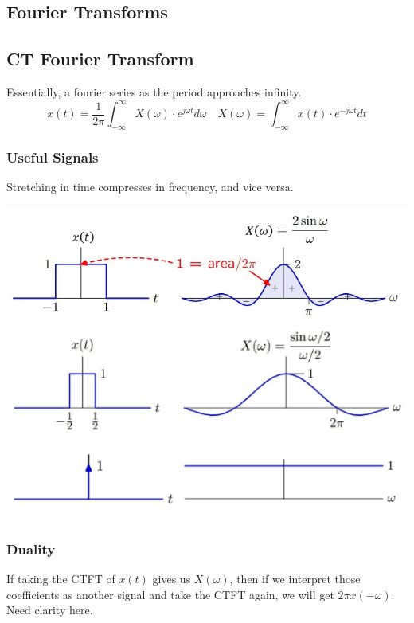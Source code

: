 \documentclass{article}
\begin{document}
\newpage
\begin{multicols}{2}
\section{Fourier Transforms}
\subsection{CT Fourier Transform}
Essentially, a fourier series as the period approaches infinity.
\[ x(t) = \frac{1}{2\pi} \int_{-\infty}^{\infty} X(\omega)\cdot e^{j\omega t} d\omega \quad X(\omega) = \int_{-\infty}^{\infty} x(t) \cdot e^{-j\omega t} dt \]

\subsubsection{Useful Signals}
Stretching in time compresses in frequency, and vice versa.
\begin{center}
\includegraphics[scale=.6]{ctft_rectangular_pulse.png}
\includegraphics[scale=.75]{ctft_rectangular_pulse_compressed.png}
\includegraphics[scale=.75]{ctft_impulse.png}
\end{center}

\subsubsection{Duality}
If taking the CTFT of $x(t)$ gives us $X(\omega)$, then if we interpret those coefficients as another signal and take the CTFT again, we will get $2\pi x(-\omega)$. Need clarity here.


\end{multicols}
\end{document}
